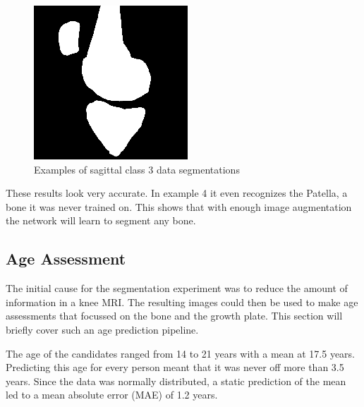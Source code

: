 \begin{figure}[H]
\endminipage\hfill
{}%
  \includegraphics[width=\linewidth]{imgs/transfer_pers_y4.png}
\endminipage
\caption{Examples of sagittal class 3 data segmentations}
\end{figure}

These results look very accurate. In example 4 it even recognizes the Patella, a bone it was never trained on. This shows that with enough image augmentation the network will learn to segment any bone.

\subsection{Age Assessment}

The initial cause for the segmentation experiment was to reduce the amount of information in a knee MRI. The resulting images could then be used to make age assessments that focussed on the bone and the growth plate. This section will briefly cover such an age prediction pipeline.

The age of the candidates ranged from 14 to 21 years with a mean at 17.5 years. Predicting this age for every person meant that it was never off more than 3.5 years. Since the data was normally distributed, a static prediction of the mean led to a mean absolute error (MAE) of 1.2 years.

